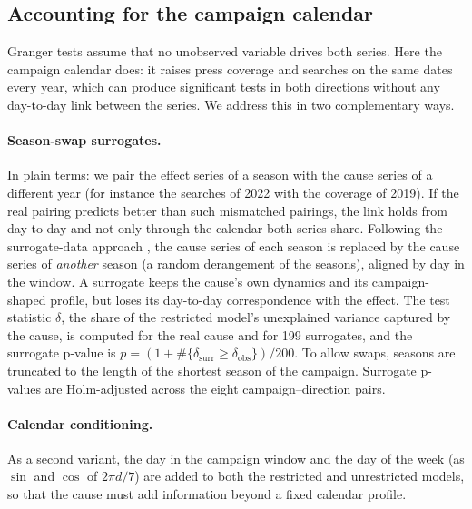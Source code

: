 \documentclass[11pt,a4paper]{article}
\begin{document}
\subsection{Accounting for the campaign calendar}\label{sec:calendar}
Granger tests assume that no unobserved variable drives both series. Here the campaign calendar does: it raises press coverage and searches on the same dates every year, which can produce significant tests in both directions without any day-to-day link between the series. We address this in two complementary ways.

\paragraph{Season-swap surrogates.} In plain terms: we pair the effect series of a season with the cause series of a different year (for instance the searches of 2022 with the coverage of 2019). If the real pairing predicts better than such mismatched pairings, the link holds from day to day and not only through the calendar both series share. Following the surrogate-data approach \cite{theiler1992}, the cause series of each season is replaced by the cause series of \emph{another} season (a random derangement of the seasons), aligned by day in the window. A surrogate keeps the cause's own dynamics and its campaign-shaped profile, but loses its day-to-day correspondence with the effect. The test statistic $\delta$, the share of the restricted model's unexplained variance captured by the cause, is computed for the real cause and for 199 surrogates, and the surrogate p-value is $p=(1+\#\{\delta_{\mathrm{surr}}\ge\delta_{\mathrm{obs}}\})/200$. To allow swaps, seasons are truncated to the length of the shortest season of the campaign. Surrogate p-values are Holm-adjusted across the eight campaign--direction pairs.

\paragraph{Calendar conditioning.} As a second variant, the day in the campaign window and the day of the week (as $\sin$ and $\cos$ of $2\pi d/7$) are added to both the restricted and unrestricted models, so that the cause must add information beyond a fixed calendar profile.
\end{document}

